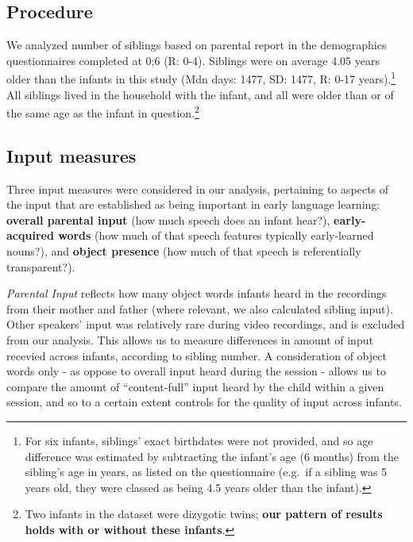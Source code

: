 \documentclass[man,floatsintext]{apa6}
\let\rmarkdownfootnote\footnote%
\def\footnote{\protect\rmarkdownfootnote}
\begin{document}
\hypertarget{procedure}{%
\subsection{Procedure}\label{procedure}}

We analyzed number of siblings based on parental report in the demographics questionnaires completed at 0;6 (R: 0-4). Siblings were on average 4.05 years older than the infants in this study (Mdn days: 1477, SD: 1477, R: 0-17 years).\footnote{For six infants, siblings' exact birthdates were not provided, and so age difference was estimated by subtracting the infant's age (6 months) from the sibling's age in years, as listed on the questionnaire (e.g.~if a sibling was 5 years old, they were classed as being 4.5 years older than the infant).} All siblings lived in the household with the infant, and all were older than or of the same age as the infant in question.\footnote{Two infants in the dataset were dizygotic twins; \textbf{our pattern of results holds with or without these infants}.}

\hypertarget{input-measures}{%
\subsection{Input measures}\label{input-measures}}

Three input measures were considered in our analysis, pertaining to aspects of the input that are established as being important in early language learning: \textbf{overall parental input} (how much speech does an infant hear?), \textbf{early-acquired words} (how much of that speech features typically early-learned nouns?), and \textbf{object presence} (how much of that speech is referentially transparent?).

\emph{Parental Input} reflects how many object words infants heard in the recordings from their mother and father (where relevant, we also calculated sibling input). Other speakers' input was relatively rare during video recordings, and is excluded from our analysis. This allows us to measure differences in amount of input recevied across infants, according to sibling number. A consideration of object words only - as oppose to overall input heard during the session - allows us to compare the amount of \enquote{content-full} input heard by the child within a given session, and so to a certain extent controls for the quality of input across infants.
\end{document}
